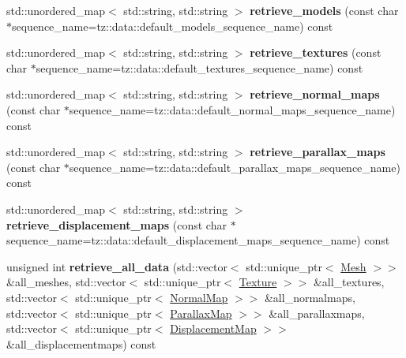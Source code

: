 \begin{DoxyCompactItemize}
std\+::unordered\+\_\+map$<$ std\+::string, std\+::string $>$ {\bfseries retrieve\+\_\+models} (const char $\ast$sequence\+\_\+name=tz\+::data\+::default\+\_\+models\+\_\+sequence\+\_\+name) const
\item 
\mbox{\label{classtz_1_1data_1_1_manager_a34794eeba3213538092c71493ef42dda}} 
std\+::unordered\+\_\+map$<$ std\+::string, std\+::string $>$ {\bfseries retrieve\+\_\+textures} (const char $\ast$sequence\+\_\+name=tz\+::data\+::default\+\_\+textures\+\_\+sequence\+\_\+name) const
\item 
\mbox{\label{classtz_1_1data_1_1_manager_a223bf9e1245c4ed253be667086fd7165}} 
std\+::unordered\+\_\+map$<$ std\+::string, std\+::string $>$ {\bfseries retrieve\+\_\+normal\+\_\+maps} (const char $\ast$sequence\+\_\+name=tz\+::data\+::default\+\_\+normal\+\_\+maps\+\_\+sequence\+\_\+name) const
\item 
\mbox{\label{classtz_1_1data_1_1_manager_a27a9b4cd6d382f43729b7672e3ffdd99}} 
std\+::unordered\+\_\+map$<$ std\+::string, std\+::string $>$ {\bfseries retrieve\+\_\+parallax\+\_\+maps} (const char $\ast$sequence\+\_\+name=tz\+::data\+::default\+\_\+parallax\+\_\+maps\+\_\+sequence\+\_\+name) const
\item 
\mbox{\label{classtz_1_1data_1_1_manager_a8ea220b62bc50df0cad8ecf4a2c8102f}} 
std\+::unordered\+\_\+map$<$ std\+::string, std\+::string $>$ {\bfseries retrieve\+\_\+displacement\+\_\+maps} (const char $\ast$sequence\+\_\+name=tz\+::data\+::default\+\_\+displacement\+\_\+maps\+\_\+sequence\+\_\+name) const
\item 
\mbox{\label{classtz_1_1data_1_1_manager_a22fe43e7c985db9adbadc2be1c6ab5cd}} 
unsigned int {\bfseries retrieve\+\_\+all\+\_\+data} (std\+::vector$<$ std\+::unique\+\_\+ptr$<$ \mbox{\hyperlink{class_mesh}{Mesh}} $>$$>$ \&all\+\_\+meshes, std\+::vector$<$ std\+::unique\+\_\+ptr$<$ \mbox{\hyperlink{class_texture}{Texture}} $>$$>$ \&all\+\_\+textures, std\+::vector$<$ std\+::unique\+\_\+ptr$<$ \mbox{\hyperlink{class_normal_map}{Normal\+Map}} $>$$>$ \&all\+\_\+normalmaps, std\+::vector$<$ std\+::unique\+\_\+ptr$<$ \mbox{\hyperlink{class_parallax_map}{Parallax\+Map}} $>$$>$ \&all\+\_\+parallaxmaps, std\+::vector$<$ std\+::unique\+\_\+ptr$<$ \mbox{\hyperlink{class_displacement_map}{Displacement\+Map}} $>$$>$ \&all\+\_\+displacementmaps) const
\end{DoxyCompactItemize}



